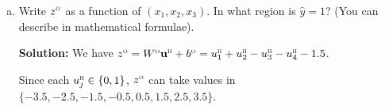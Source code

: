 \documentclass[11pt]{article}
\newcommand{\bbf}{\mathbf{b}}
\newcommand{\ubf}{\mathbf{u}}
\newcommand{\xbf}{\mathbf{x}}
\newcommand{\zbf}{\mathbf{z}}
\def\hid{\textsc{\tiny H}}
\def\out{\textsc{\tiny O}}
\begin{document}
\begin{enumerate}
\begin{enumerate}[(a)]
\textbf{Solution:}
We have $\zbf^\hid = W^\hid \xbf + \bbf^\hid$:
\begin{align*}
z_1^\hid &= x_1 + x_3 \\
z_2^\hid &= x_2 + x_3 \\
z_3^\hid &= x_1 + x_2 - 1 \\
z_4^\hid &= x_1 + x_2 + x_3 + 1
\end{align*}
Since $u_j^\hid = g_{\rm act}(z_j^\hid)$, we have:
\begin{align*}
u_1^\hid &= \begin{cases} 1 & \text{if } x_1 + x_3 \geq 0 \\ 0 & \text{otherwise} \end{cases} \\
u_2^\hid &= \begin{cases} 1 & \text{if } x_2 + x_3 \geq 0 \\ 0 & \text{otherwise} \end{cases} \\
u_3^\hid &= \begin{cases} 1 & \text{if } x_1 + x_2 \geq 1 \\ 0 & \text{otherwise} \end{cases} \\
u_4^\hid &= \begin{cases} 1 & \text{if } x_1 + x_2 + x_3 \geq -1 \\ 0 & \text{otherwise} \end{cases}
\end{align*}
The hyperplanes where $u_j^\hid = 1$ are:
\begin{itemize}
\item $u_1^\hid = 1$: $x_1 + x_3 \geq 0$
\item $u_2^\hid = 1$: $x_2 + x_3 \geq 0$
\item $u_3^\hid = 1$: $x_1 + x_2 \geq 1$
\item $u_4^\hid = 1$: $x_1 + x_2 + x_3 \geq -1$
\end{itemize}

\item Write $z^\out$ as a function of $(x_1,x_2, x_3)$.  In what region is
$\hat{y}=1$? (You can describe in mathematical formulae).

\textbf{Solution:}
We have $z^\out = W^\out \ubf^\hid + b^\out = u_1^\hid + u_2^\hid - u_3^\hid - u_4^\hid - 1.5$.

Since each $u_j^\hid \in \{0,1\}$, $z^\out$ can take values in $\{-3.5, -2.5, -1.5, -0.5, 0.5, 1.5, 2.5, 3.5\}$.


\end{enumerate}
\end{enumerate}
\end{document}
